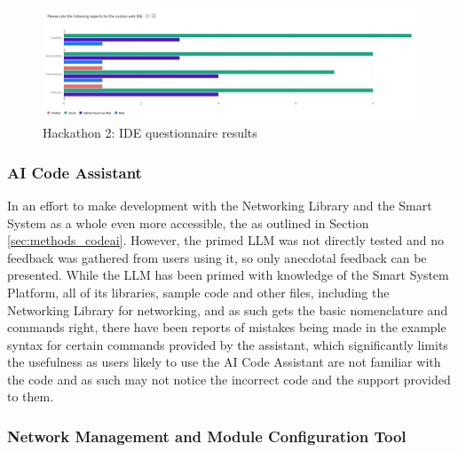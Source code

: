 \begin{figure}[H]
    \centering
    \includegraphics[width=\linewidth]{overleaf/images/ide_rating.jpg}
    \vspace{\ftspace}
    \caption{Hackathon 2: IDE questionnaire results}
    \vspace{\ftspace}
    \label{fig:website}
\end{figure}

\subsubsection{\label{sec:res_ai_code}AI Code Assistant}
In an effort to make development with the Networking Library and the Smart System as a whole even more accessible, the as outlined in Section \ref{sec:methods_codeai}. However, the primed LLM was not directly tested and no feedback was gathered from users using it, so only anecdotal feedback can be presented. While the LLM has been primed with knowledge of the Smart System Platform, all of its libraries, sample code and other files, including the Networking Library for networking, and as such gets the basic nomenclature and commands right, there have been reports of mistakes being made in the example syntax for certain commands provided by the assistant, which significantly limits the usefulness as users likely to use the AI Code Assistant are not familiar with the code and as such may not notice the incorrect code and the support provided to them.

\subsubsection{\label{sec:res_nmmct}Network Management and Module Configuration Tool}

